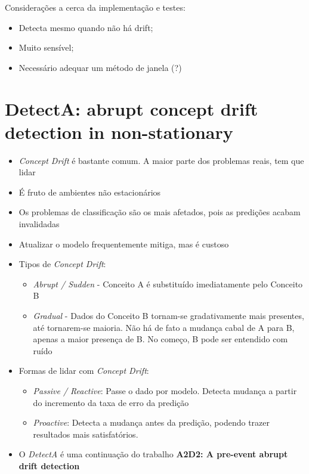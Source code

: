 \documentclass[qual, classic, a4paper]{ufbathesis}
\begin{document}
Considerações a cerca da implementação e testes:

\begin{itemize}
    \item Detecta mesmo quando não há drift;
    \item Muito sensível;
    \item Necessário adequar um método de janela (?)
\end{itemize}


\section{DetectA: abrupt concept drift detection in non-stationary \cite{ESCOVEDO2018119}}

\begin{itemize}
    \item \textit{Concept Drift} é bastante comum. A maior parte dos problemas reais, tem que lidar
    \item É fruto de ambientes não estacionários
    \item Os problemas de classificação são os mais afetados, pois as predições acabam invalidadas
    \item Atualizar o modelo frequentemente mitiga, mas é custoso
    \item Tipos de \textit{Concept Drift}:
    \begin{itemize}
        \item \textit{Abrupt / Sudden} - Conceito A é substituído imediatamente pelo Conceito B
        \item \textit{Gradual} - Dados do Conceito B tornam-se gradativamente mais presentes, até tornarem-se maioria.
        Não há de fato a mudança cabal de A para B, apenas a maior presença de B. 
        No começo, B pode ser entendido com ruído
    \end{itemize}
    \item Formas de lidar com \textit{Concept Drift}:
    \begin{itemize}
        \item \textit{Passive / Reactive}: Passe o dado por modelo. Detecta mudança a partir do incremento da taxa de erro da predição
        \item \textit{Proactive}: Detecta a mudança antes da predição, podendo trazer resultados mais satisfatórios.
    \end{itemize}
    \item O \textit{DetectA} é uma continuação do trabalho \textbf{A2D2: A pre-event abrupt drift detection} \cite{Escovedo2015A2D2AP}

\end{itemize}
\end{document}
